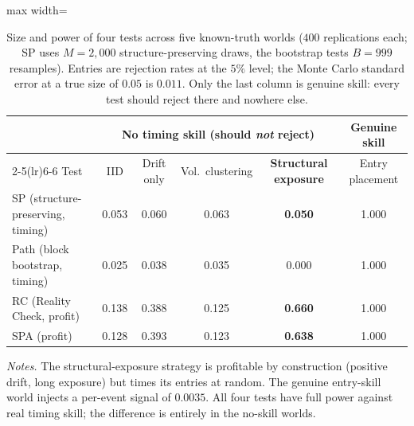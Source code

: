 \documentclass[risks,article,submit,pdftex,oneauthor]{Definitions/mdpi}
\begin{document}
\begin{table}[H]
\centering
\caption{Size and power of four tests across five known-truth worlds ($400$ replications each; SP uses $M=2{,}000$ structure-preserving draws, the bootstrap tests $B=999$ resamples). Entries are rejection rates at the $5\%$ level; the Monte Carlo standard error at a true size of $0.05$ is $0.011$. Only the last column is genuine skill: every test should reject there and nowhere else.}
\label{tab:competitor}
{\small
\renewcommand{\arraystretch}{1.15}
\begin{adjustbox}{max width=\textwidth}
\begin{tabular}{@{}lccccc@{}}
\toprule
& \multicolumn{4}{c}{No timing skill (should \emph{not} reject)} & Genuine skill \\
\cmidrule(lr){2-5}\cmidrule(lr){6-6}
Test & IID & Drift only & Vol.\ clustering & \textbf{Structural exposure} & Entry placement \\
\midrule
SP (structure-preserving, timing) & 0.053 & 0.060 & 0.063 & \textbf{0.050} & 1.000 \\
Path (block bootstrap, timing)    & 0.025 & 0.038 & 0.035 & 0.000 & 1.000 \\
RC (Reality Check, profit)        & 0.138 & 0.388 & 0.125 & \textbf{0.660} & 1.000 \\
SPA (profit)                      & 0.128 & 0.393 & 0.123 & \textbf{0.638} & 1.000 \\
\bottomrule
\end{tabular}
\end{adjustbox}
}
\par\vspace{0.5em}
\begin{minipage}{0.95\textwidth}
\centering
\footnotesize\emph{Notes.} The structural-exposure strategy is profitable by construction (positive drift, long exposure) but times its entries at random. The genuine entry-skill world injects a per-event signal of $0.0035$. All four tests have full power against real timing skill; the difference is entirely in the no-skill worlds.
\end{minipage}
\end{table}
\end{document}

